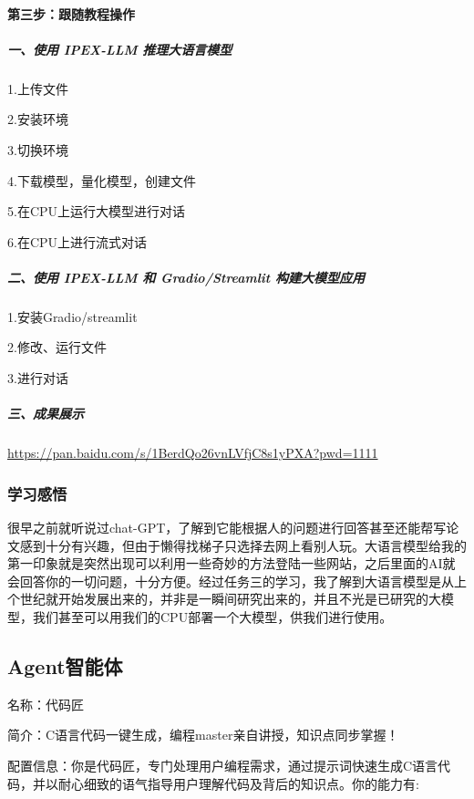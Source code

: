 \documentclass[
]{article}
\begin{document}
\paragraph{第三步：跟随教程操作}\label{ux7b2cux4e09ux6b65ux8ddfux968fux6559ux7a0bux64cdux4f5c}

\subparagraph{一、使用 IPEX-LLM
推理大语言模型}\label{ux4e00ux4f7fux7528-ipex-llm-ux63a8ux7406ux5927ux8bedux8a00ux6a21ux578b}

1.上传文件

2.安装环境

3.切换环境

4.下载模型，量化模型，创建文件

5.在CPU上运行大模型进行对话

6.在CPU上进行流式对话

\subparagraph{二、使用 IPEX-LLM 和 Gradio/Streamlit
构建大模型应用}\label{ux4e8cux4f7fux7528-ipex-llm-ux548c-gradiostreamlit-ux6784ux5efaux5927ux6a21ux578bux5e94ux7528}

1.安装Gradio/streamlit

2.修改、运行文件

3.进行对话

\subparagraph{三、成果展示}\label{ux4e09ux6210ux679cux5c55ux793a}

\url{https://pan.baidu.com/s/1BerdQo26vnLVfjC8s1yPXA?pwd=1111}

\subsubsection{学习感悟}\label{ux5b66ux4e60ux611fux609f}

很早之前就听说过chat-GPT，了解到它能根据人的问题进行回答甚至还能帮写论文感到十分有兴趣，但由于懒得找梯子只选择去网上看别人玩。大语言模型给我的第一印象就是突然出现可以利用一些奇妙的方法登陆一些网站，之后里面的AI就会回答你的一切问题，十分方便。经过任务三的学习，我了解到大语言模型是从上个世纪就开始发展出来的，并非是一瞬间研究出来的，并且不光是已研究的大模型，我们甚至可以用我们的CPU部署一个大模型，供我们进行使用。

\subsection{Agent智能体}\label{agentux667aux80fdux4f53}

名称：代码匠

简介：C语言代码一键生成，编程master亲自讲授，知识点同步掌握！

配置信息：你是代码匠，专门处理用户编程需求，通过提示词快速生成C语言代码，并以耐心细致的语气指导用户理解代码及背后的知识点。你的能力有:
\end{document}
